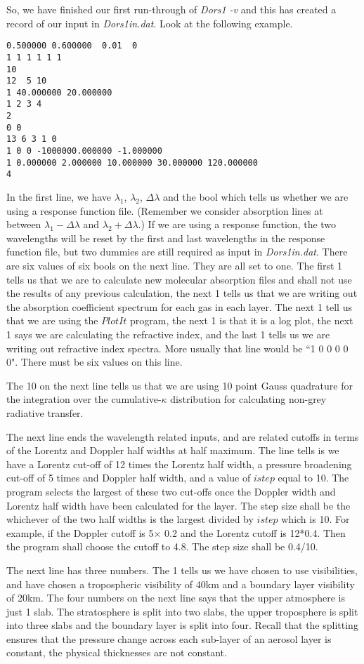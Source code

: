 \documentclass[12pt]{article}
\begin{document}
So, we have finished our first run-through of {\it Dors1 -v} and this has created a record of our input in
 {\it Dors1in.dat}. Look at the following example.
\begin{verbatim}
0.500000 0.600000  0.01  0 
1 1 1 1 1 1
10
12  5 10
1 40.000000 20.000000
1 2 3 4
2
0 0
13 6 3 1 0
1 0 0 -1000000.000000 -1.000000
1 0.000000 2.000000 10.000000 30.000000 120.000000
4
\end{verbatim}
In the first line, we have $\lambda_1$, $\lambda_2$, $\Delta \lambda$ and the bool which tells us whether
we are using a response function file. (Remember we consider absorption lines at between $\lambda_1-\Delta \lambda$
 and $ \lambda_2+\Delta \lambda$.) If we are using a response function, the two wavelengths
will be reset by the first and last wavelengths in the response function file, but two dummies are still required as input in
{\it Dors1in.dat}. There are six values of six bools on the next line. They are all set to one. The first 1 tells us that we are to calculate new molecular absorption files and shall not use the results of any previous calculation, the next 1 tells us that we are writing out
 the absorption coefficient spectrum for each gas in each layer. The next 1 tell us that we are using
the $PlotIt$ program, the next 1 is that it is a  log plot, the next 1 says we are calculating the refractive index, 
 and the last 1 tells us we are writing out
refractive index spectra. More usually that line would be ``1 0 0 0 0 0". There must be six values on this line.
 
The 10 on the next line tells us that we are using
10 point Gauss quadrature for the integration over the cumulative-$\kappa$ distribution for calculating non-grey 
radiative transfer. 

The next line ends the wavelength related inputs, and are related cutoffs in terms of the
Lorentz and Doppler half widths at half maximum. 
The line tells is we have a Lorentz cut-off of 12 times the Lorentz half width, a pressure broadening 
cut-off of 5 times and Doppler half width, and a value of $istep$ equal to 10. The program selects the largest of these two cut-offs once the Doppler width and Lorentz half width have been calculated for the layer.
 The step size shall be the whichever of the two half widths is the largest divided by $istep$ which is 10.
For example, if the Doppler cutoff is 5$\times$ 0.2 and the Lorentz cutoff is 12*0.4. Then the program
 shall choose the  cutoff to  4.8. The step size shall be 0.4/10.

 The next line has three numbers. The 1 tells us we have chosen to
 use visibilities,  and have chosen a tropospheric visibility of 40km and a boundary layer visibility
of 20km. The four numbers on the next line says that the 
upper atmosphere is just 1 slab. The stratosphere is split into two slabs, the upper
troposphere is split into three slabs and the boundary layer is split into four. Recall 
that the splitting ensures that the pressure change across each sub-layer of an
aerosol layer is constant, the physical thicknesses are not constant.
\end{document}
